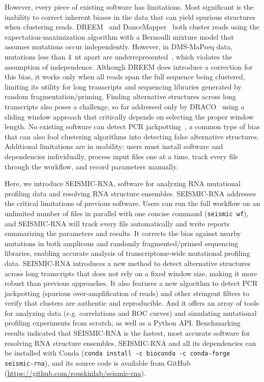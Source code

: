 \documentclass[unnumsec,webpdf,contemporary,large]{oup-authoring-template}%
\theoremstyle{thmstyleone}%
\theoremstyle{thmstyletwo}%
\theoremstyle{thmstylethree}%
\begin{document}
However, every piece of existing software has limitations.
Most significant is the inability to correct inherent biases in the data that can yield spurious structures when clustering reads.
DREEM~\cite{Tomezsko2020} and DanceMapper~\cite{Olson2022} both cluster reads using the expectation-maximization algorithm with a Bernoulli mixture model that assumes mutations occur independently.
However, in DMS-MaPseq data, mutations less than 4~nt apart are underrepresented~\cite{Tomezsko2020}, which violates the assumption of independence.
Although DREEM does introduce a correction for this bias, it works only when all reads span the full sequence being clustered, limiting its utility for long transcripts and sequencing libraries generated by random fragmentation/priming.
Finding alternative structures across long transcripts also poses a challenge, so far addressed only by DRACO~\cite{Morandi2021} using a sliding window approach that critically depends on selecting the proper window length.
No existing software can detect PCR jackpotting~\cite{Marotz2019}, a common type of bias that can also fool clustering algorithms into detecting false alternative structures.
Additional limitations are in usability: users must install software and dependencies individually, process input files one at a time, track every file through the workflow, and record parameters manually.

Here, we introduce SEISMIC-RNA, software for analyzing RNA mutational profiling data and resolving RNA structure ensembles.
SEISMIC-RNA addresses the critical limitations of previous software.
Users can run the full workflow on an unlimited number of files in parallel with one concise command (\verb|seismic wf|), and SEISMIC-RNA will track every file automatically and write reports summarizing the parameters and results.
It corrects the bias against nearby mutations in both amplicons and randomly fragmented/primed sequencing libraries, enabling accurate analysis of transcriptome-wide mutational profiling data.
SEISMIC-RNA introduces a new method to detect alternative structures across long transcripts that does not rely on a fixed window size, making it more robust than previous approaches.
It also features a new algorithm to detect PCR jackpotting (spurious over-amplification of reads) and other stringent filters to verify that clusters are authentic and reproducible.
And it offers an array of tools for analyzing data (e.g. correlations and ROC curves) and simulating mutational profiling experiments from scratch, as well as a Python API.
Benchmarking results indicated that SEISMIC-RNA is the fastest, most accurate software for resolving RNA structure ensembles.
SEISMIC-RNA and all its dependencies can be installed with Conda (\verb|conda install -c bioconda -c conda-forge seismic-rna|), and its source code is available from GitHub (\url{https://github.com/rouskinlab/seismic-rna}).
\end{document}

